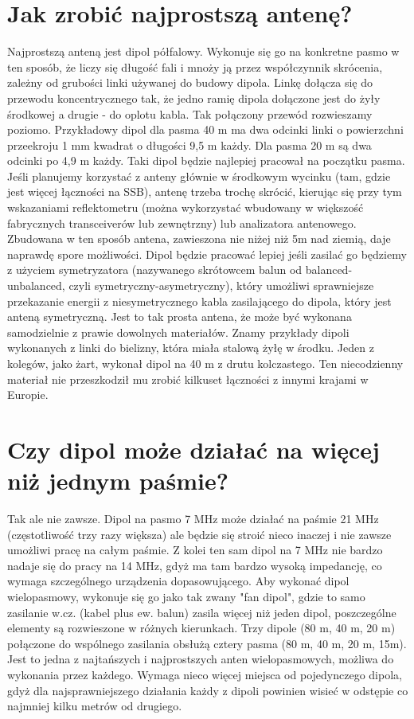 \documentclass[a4paper,12pt]{article}
\begin{document}
\section{Jak zrobić najprostszą antenę?}
Najprostszą anteną jest dipol półfalowy. Wykonuje się go na konkretne pasmo w ten sposób, że liczy się długość fali i mnoży ją przez współczynnik skrócenia, zależny od grubości linki używanej do budowy dipola. Linkę dołącza się do przewodu koncentrycznego tak, że jedno ramię dipola dołączone jest do żyły środkowej a drugie - do oplotu kabla. Tak połączony przewód rozwieszamy poziomo. Przykładowy dipol dla pasma 40 m ma dwa odcinki linki o powierzchni przeekroju 1 mm kwadrat o długości 9,5 m każdy. Dla pasma 20 m są dwa odcinki po 4,9 m każdy. Taki dipol będzie najlepiej pracował na początku pasma. Jeśli planujemy korzystać z anteny głównie w środkowym wycinku (tam, gdzie jest więcej łączności na SSB), antenę trzeba trochę skrócić, kierując się przy tym wskazaniami reflektometru (można wykorzystać wbudowany w większość fabrycznych transceiverów lub zewnętrzny) lub analizatora antenowego. Zbudowana w ten sposób antena, zawieszona nie niżej niż 5m nad ziemią, daje naprawdę spore możliwości. Dipol będzie pracować lepiej jeśli zasilać go będziemy z użyciem symetryzatora (nazywanego skrótowcem balun od balanced-unbalanced, czyli symetryczny-asymetryczny), który umożliwi sprawniejsze przekazanie energii z niesymetrycznego kabla zasilającego do dipola, który jest anteną symetryczną.
Jest to tak prosta antena, że może być wykonana samodzielnie z prawie dowolnych materiałów. Znamy przykłady dipoli wykonanych z linki do bielizny, która miała stalową żyłę w środku. Jeden z kolegów, jako żart, wykonał dipol na 40 m z drutu kolczastego. Ten niecodzienny materiał nie przeszkodził mu zrobić kilkuset łączności z innymi krajami w Europie.

\section{Czy dipol może działać na więcej niż jednym paśmie?}
Tak ale nie zawsze. Dipol na pasmo 7 MHz może działać na paśmie 21 MHz (częstotliwość trzy razy większa) ale będzie się stroić nieco inaczej i nie zawsze umożliwi pracę na całym paśmie. Z kolei ten sam dipol na 7 MHz nie bardzo nadaje się do pracy na 14 MHz, gdyż ma tam bardzo wysoką impedancję, co wymaga szczególnego urządzenia dopasowującego. Aby wykonać dipol wielopasmowy, wykonuje się go jako tak zwany "fan dipol", gdzie to samo zasilanie w.cz. (kabel plus ew. balun) zasila więcej niż jeden dipol, poszczególne elementy są rozwieszone w różnych kierunkach. Trzy dipole (80 m, 40 m, 20 m) połączone do wspólnego zasilania obsłużą cztery pasma (80 m, 40 m, 20 m, 15m). Jest to jedna z najtańszych i najprostszych anten wielopasmowych, możliwa do wykonania przez każdego. Wymaga nieco więcej miejsca od pojedynczego dipola, gdyż dla najsprawniejszego działania każdy z dipoli powinien wisieć w odstępie co najmniej kilku metrów od drugiego.
\end{document}
